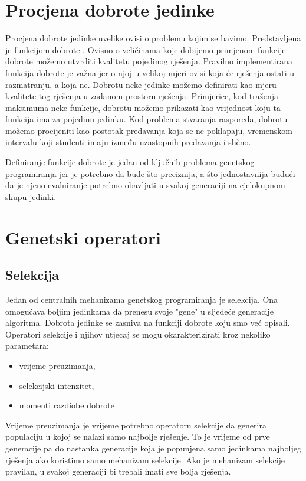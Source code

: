 \documentclass[times, utf8, zavrsni]{fer}
\begin{document}
\section{Procjena dobrote jedinke}
Procjena dobrote jedinke uvelike ovisi o problemu kojim se bavimo. Predstavljena je funkcijom dobrote . Ovisno o veličinama koje dobijemo primjenom funkcije dobrote možemo utvrditi kvalitetu pojedinog rješenja. Pravilno implementirana funkcija dobrote je važna jer o njoj u velikoj mjeri ovisi koja će rješenja ostati u razmatranju, a koja ne. Dobrotu neke jedinke možemo definirati kao mjeru kvalitete tog rješenja u zadanom prostoru rješenja. Primjerice, kod traženja maksimuma neke funkcije, dobrotu možemo prikazati kao vrijednost koju ta funkcija ima za pojedinu jedinku. Kod problema stvaranja rasporeda, dobrotu možemo procijeniti kao postotak predavanja koja se ne poklapaju, vremenskom intervalu koji studenti imaju između uzastopnih predavanja i slično. 

Definiranje funkcije dobrote je jedan od ključnih problema genetskog programiranja jer je potrebno da bude što preciznija, a što jednostavnija budući da je njeno evaluiranje potrebno obavljati u svakoj generaciji na cjelokupnom skupu jedinki. 

\section{Genetski operatori}

\subsection{Selekcija}
Jedan od centralnih mehanizama genetskog programiranja je selekcija. Ona omogućava boljim jedinkama da prenesu svoje "gene" u sljedeće generacije algoritma. Dobrota jedinke se zasniva na funkciji dobrote koju smo već opisali. Operatori selekcije i njihov utjecaj se mogu okarakterizirati kroz nekoliko parametara:

\begin{itemize}
\item{vrijeme preuzimanja,}
\item{selekcijski intenzitet,}
\item{momenti razdiobe dobrote}
\end{itemize}

Vrijeme preuzimanja je vrijeme potrebno operatoru selekcije da generira populaciju u kojoj se nalazi samo najbolje rješenje. To je vrijeme od prve generacije pa do nastanka generacije koja je popunjena samo jedinkama najboljeg rješenja ako koristimo samo mehanizam selekcije. Ako je mehanizam selekcije pravilan, u svakoj generaciji bi trebali imati sve bolja rješenja.
\end{document}
